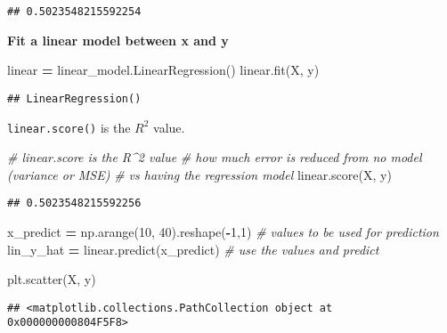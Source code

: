 \documentclass[
]{book}
\newenvironment{Shaded}{\begin{snugshade}}{\end{snugshade}}
\newcommand{\CommentTok}[1]{\textcolor[rgb]{0.56,0.35,0.01}{\textit{#1}}}
\newcommand{\DecValTok}[1]{\textcolor[rgb]{0.00,0.00,0.81}{#1}}
\newcommand{\NormalTok}[1]{#1}
\newcommand{\OperatorTok}[1]{\textcolor[rgb]{0.81,0.36,0.00}{\textbf{#1}}}
\begin{document}
\begin{verbatim}
## 0.5023548215592254
\end{verbatim}

\textbf{Fit a linear model between x and y}

\begin{Shaded}
\begin{Highlighting}[]
\NormalTok{linear }\OperatorTok{=}\NormalTok{ linear\_model.LinearRegression()}
\NormalTok{linear.fit(X, y)}
\end{Highlighting}
\end{Shaded}

\begin{verbatim}
## LinearRegression()
\end{verbatim}

\texttt{linear.score()} is the \(R^2\) value.

\begin{Shaded}
\begin{Highlighting}[]
\CommentTok{\# linear.score is the R\^{}2 value}
\CommentTok{\# how much error is reduced from no model (variance or MSE)}
\CommentTok{\# vs having the regression model}
\NormalTok{linear.score(X, y)}
\end{Highlighting}
\end{Shaded}

\begin{verbatim}
## 0.5023548215592256
\end{verbatim}

\begin{Shaded}
\begin{Highlighting}[]
\NormalTok{x\_predict }\OperatorTok{=}\NormalTok{ np.arange(}\DecValTok{10}\NormalTok{, }\DecValTok{40}\NormalTok{).reshape(}\OperatorTok{{-}}\DecValTok{1}\NormalTok{,}\DecValTok{1}\NormalTok{) }\CommentTok{\# values to be used for prediction}
\NormalTok{lin\_y\_hat }\OperatorTok{=}\NormalTok{ linear.predict(x\_predict) }\CommentTok{\# use the values and predict}
\end{Highlighting}
\end{Shaded}

\begin{Shaded}
\begin{Highlighting}[]
\NormalTok{plt.scatter(X, y)}
\end{Highlighting}
\end{Shaded}

\begin{verbatim}
## <matplotlib.collections.PathCollection object at 0x000000000804F5F8>
\end{verbatim}
\end{document}
